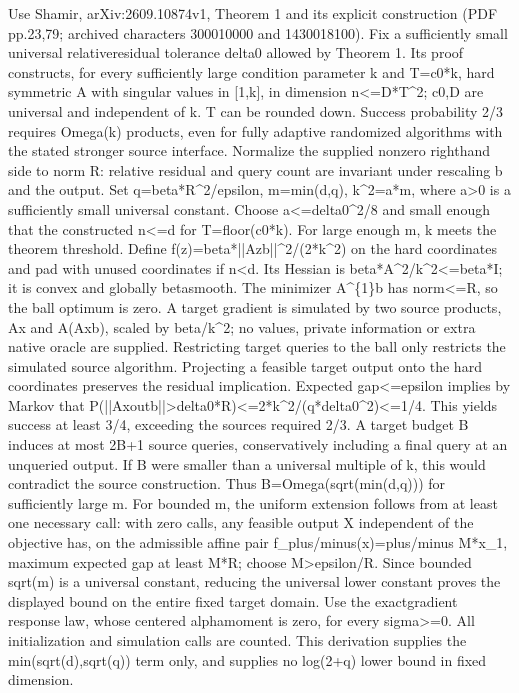 \documentclass[10pt,a4paper]{article}
\begin{document}
Use Shamir, arXiv:2609.10874v1, Theorem 1 and its explicit construction (PDF pp.23,79; archived characters 300010000 and 1430018100). Fix a sufficiently small universal relativeresidual tolerance delta0 allowed by Theorem 1. Its proof constructs, for every sufficiently large condition parameter k and T=c0*k, hard symmetric A with singular values in [1,k], in dimension n<=D*T\textasciicircum{}2; c0,D are universal and independent of k. T can be rounded down. Success probability 2/3 requires Omega(k) products, even for fully adaptive randomized algorithms with the stated stronger source interface. Normalize the supplied nonzero righthand side to norm R: relative residual and query count are invariant under rescaling b and the output. Set q=beta*R\textasciicircum{}2/epsilon, m=min(d,q), k\textasciicircum{}2=a*m, where a>0 is a sufficiently small universal constant. Choose a<=delta0\textasciicircum{}2/8 and small enough that the constructed n<=d for T=floor(c0*k). For large enough m, k meets the theorem threshold. Define f(z)=beta*||Azb||\textasciicircum{}2/(2*k\textasciicircum{}2) on the hard coordinates and pad with unused coordinates if n<d. Its Hessian is beta*A\textasciicircum{}2/k\textasciicircum{}2<=beta*I; it is convex and globally betasmooth. The minimizer A\textasciicircum{}\{1\}b has norm<=R, so the ball optimum is zero. A target gradient is simulated by two source products, Ax and A(Axb), scaled by beta/k\textasciicircum{}2; no values, private information or extra native oracle are supplied. Restricting target queries to the ball only restricts the simulated source algorithm. Projecting a feasible target output onto the hard coordinates preserves the residual implication. Expected gap<=epsilon implies by Markov that P(||Axoutb||>delta0*R)<\allowbreak{}=2*k\textasciicircum{}2/(q*delta0\textasciicircum{}2)<=1/4\allowbreak{}. This yields success at least 3/4, exceeding the sources required 2/3. A target budget B induces at most 2B+1 source queries, conservatively including a final query at an unqueried output. If B were smaller than a universal multiple of k, this would contradict the source construction. Thus B=Omega(sqrt(min(d,q))) for sufficiently large m. For bounded m, the uniform extension follows from at least one necessary call: with zero calls, any feasible output X independent of the objective has, on the admissible affine pair f\_plus/minus(x)=plus/minus M*x\_1, maximum expected gap at least M*R; choose M>epsilon/R. Since bounded sqrt(m) is a universal constant, reducing the universal lower constant proves the displayed bound on the entire fixed target domain. Use the exactgradient response law, whose centered alphamoment is zero, for every sigma>=0. All initialization and simulation calls are counted. This derivation supplies the min(sqrt(d),sqrt(q)) term only, and supplies no log(2+q) lower bound in fixed dimension.
\end{document}
